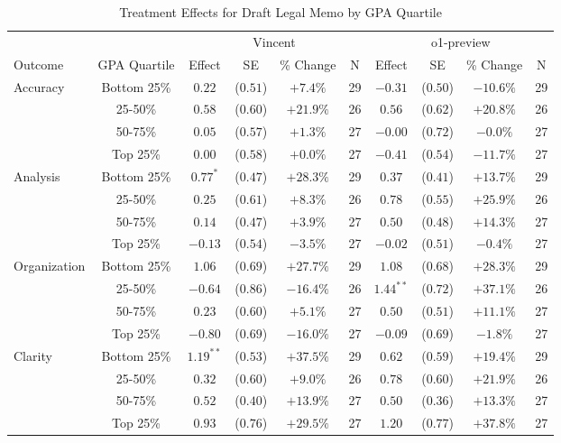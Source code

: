 \begin{table}[!htbp]
\centering
\caption{Treatment Effects for Draft Legal Memo by GPA Quartile}
\label{tab:task2_gpa}
\begin{tabular}{lccccccccc}
\hline\hline
& & \multicolumn{4}{c}{Vincent} & \multicolumn{4}{c}{o1-preview} \\
\cline{3-10}
Outcome & GPA Quartile & Effect & SE & \% Change & N & Effect & SE & \% Change & N \\
\hline
\multirow{4}{*}{Accuracy} & Bottom 25\% & $0.22$ & ($0.51$) & $+7.4\%$ & 29 & $-0.31$ & ($0.50$) & $-10.6\%$ & 29 \\
& 25-50\% & $0.58$ & ($0.60$) & $+21.9\%$ & 26 & $0.56$ & ($0.62$) & $+20.8\%$ & 26 \\
& 50-75\% & $0.05$ & ($0.57$) & $+1.3\%$ & 27 & $-0.00$ & ($0.72$) & $-0.0\%$ & 27 \\
& Top 25\% & $0.00$ & ($0.58$) & $+0.0\%$ & 27 & $-0.41$ & ($0.54$) & $-11.7\%$ & 27 \\
\hline
\multirow{4}{*}{Analysis} & Bottom 25\% & $0.77^{*}$ & ($0.47$) & $+28.3\%$ & 29 & $0.37$ & ($0.41$) & $+13.7\%$ & 29 \\
& 25-50\% & $0.25$ & ($0.61$) & $+8.3\%$ & 26 & $0.78$ & ($0.55$) & $+25.9\%$ & 26 \\
& 50-75\% & $0.14$ & ($0.47$) & $+3.9\%$ & 27 & $0.50$ & ($0.48$) & $+14.3\%$ & 27 \\
& Top 25\% & $-0.13$ & ($0.54$) & $-3.5\%$ & 27 & $-0.02$ & ($0.51$) & $-0.4\%$ & 27 \\
\hline
\multirow{4}{*}{Organization} & Bottom 25\% & $1.06$ & ($0.69$) & $+27.7\%$ & 29 & $1.08$ & ($0.68$) & $+28.3\%$ & 29 \\
& 25-50\% & $-0.64$ & ($0.86$) & $-16.4\%$ & 26 & $1.44^{**}$ & ($0.72$) & $+37.1\%$ & 26 \\
& 50-75\% & $0.23$ & ($0.60$) & $+5.1\%$ & 27 & $0.50$ & ($0.51$) & $+11.1\%$ & 27 \\
& Top 25\% & $-0.80$ & ($0.69$) & $-16.0\%$ & 27 & $-0.09$ & ($0.69$) & $-1.8\%$ & 27 \\
\hline
\multirow{4}{*}{Clarity} & Bottom 25\% & $1.19^{**}$ & ($0.53$) & $+37.5\%$ & 29 & $0.62$ & ($0.59$) & $+19.4\%$ & 29 \\
& 25-50\% & $0.32$ & ($0.60$) & $+9.0\%$ & 26 & $0.78$ & ($0.60$) & $+21.9\%$ & 26 \\
& 50-75\% & $0.52$ & ($0.40$) & $+13.9\%$ & 27 & $0.50$ & ($0.36$) & $+13.3\%$ & 27 \\
& Top 25\% & $0.93$ & ($0.76$) & $+29.5\%$ & 27 & $1.20$ & ($0.77$) & $+37.8\%$ & 27 \\

\end{tabular}
\end{table}
